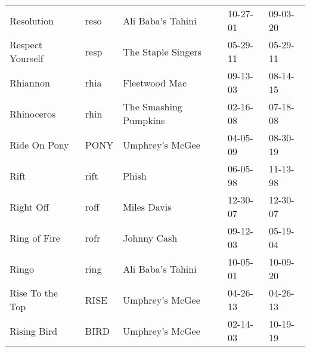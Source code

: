 \begin{longtable}{p{}p{}p{}p{}p{}}
                                                              Resolution &          reso &                                        Ali Baba's Tahini &              10-27-01 &             09-03-20 \\
                                                        Respect Yourself &          resp &                                       The Staple Singers &              05-29-11 &             05-29-11 \\
                                                                Rhiannon &          rhia &                                            Fleetwood Mac &              09-13-03 &             08-14-15 \\
                                                              Rhinoceros &          rhin &                                    The Smashing Pumpkins &              02-16-08 &             07-18-08 \\
                                                            Ride On Pony &          PONY &                                          Umphrey's McGee &              04-05-09 &             08-30-19 \\
                                                                    Rift &          rift &                                                    Phish &              06-05-98 &             11-13-98 \\
                                                               Right Off &          roff &                                              Miles Davis &              12-30-07 &             12-30-07 \\
                                                            Ring of Fire &          rofr &                                              Johnny Cash &              09-12-03 &             05-19-04 \\
                                                                   Ringo &          ring &                                        Ali Baba's Tahini &              10-05-01 &             10-09-20 \\
                                                         Rise To the Top &          RISE &                                          Umphrey's McGee &              04-26-13 &             04-26-13 \\
                                                             Rising Bird &          BIRD &                                          Umphrey's McGee &              02-14-03 &             10-19-19 \\

\end{longtable}
